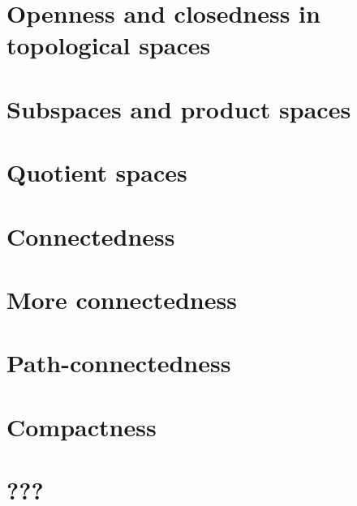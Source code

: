 \documentclass{article}
\begin{document}
\section{Openness and closedness in topological spaces}

\section{Subspaces and product spaces}

\section{Quotient spaces}

\section{Connectedness}

\section{More connectedness}

\section{Path-connectedness}

\section{Compactness}

\section{???}

\end{document}
